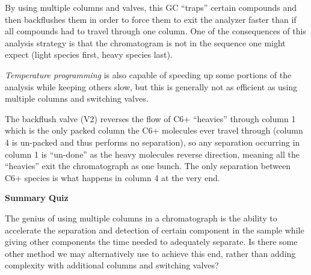 












By using multiple columns and valves, this GC ``traps'' certain compounds and then backflushes them in order to force them to exit the analyzer faster than if all compounds had to travel through one column.  One of the consequences of this analysis strategy is that the chromatogram is not in the sequence one might expect (light species first, heavy species last).

\vskip 10pt

{\it Temperature programming} is also capable of speeding up some portions of the analysis while keeping others slow, but this is generally not as efficient as using multiple columns and switching valves.

\vskip 10pt

The backflush valve (V2) reverses the flow of C6+ ``heavies'' through column 1 which is the only packed column the C6+ molecules ever travel through (column 4 is un-packed and thus performs no separation), so any separation occurring in column 1 is ``un-done'' as the heavy molecules reverse direction, meaning all the ``heavies'' exit the chromatograph as one bunch.  The only separation between C6+ species is what happens in column 4 at the very end.









\vfil \eject

\noindent
{\bf Summary Quiz}

The genius of using multiple columns in a chromatograph is the ability to accelerate the separation and detection of certain component in the sample while giving other components the time needed to adequately separate.  Is there some other method we may alternatively use to achieve this end, rather than adding complexity with additional columns and switching valves?





